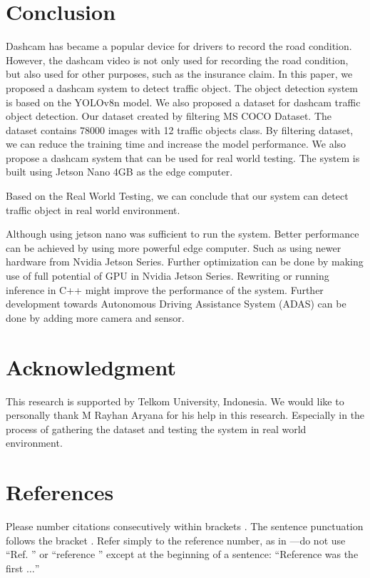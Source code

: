 \documentclass[conference]{IEEEtran}
\begin{document}
\section{Conclusion}
Dashcam has became a popular device for drivers to record the road condition. However, the dashcam video is not only used for recording the road condition, but also used for other purposes, such as the insurance claim. 
In this paper, we proposed a dashcam system to detect traffic object. The object detection system is based on the YOLOv8n model. We also proposed a dataset for dashcam traffic object detection. Our dataset created by filtering MS COCO Dataset. The dataset contains 78000 images with 12 traffic objects class.
By filtering dataset, we can reduce the training time and increase the model performance.
We also propose a dashcam system that can be used for real world testing. The system is built using Jetson Nano 4GB as the edge computer.


Based on the Real World Testing, we can conclude that our system can detect traffic object in real world environment.


Although using jetson nano was sufficient to run the system. Better performance can be achieved by using more powerful edge computer. Such as using newer hardware from Nvidia Jetson Series. Further optimization can be done by making use of full potential of GPU in Nvidia Jetson Series. Rewriting or running inference in C++ might improve the performance of the system.
Further development towards Autonomous Driving Assistance System (ADAS) can be done by adding more camera and sensor.
\section*{Acknowledgment}
This research is supported by Telkom University, Indonesia.
We would like to personally thank M Rayhan Aryana for his help in this research.
Especially in the process of gathering the dataset and testing the system in real world environment.
\section*{References}

Please number citations consecutively within brackets \cite{b1}. The 
sentence punctuation follows the bracket \cite{b2}. Refer simply to the reference 
number, as in \cite{b3}---do not use ``Ref. \cite{b3}'' or ``reference \cite{b3}'' except at 
the beginning of a sentence: ``Reference \cite{b3} was the first $\ldots$''
\end{document}
